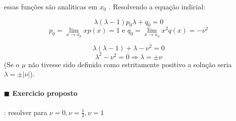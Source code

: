    essas funções são analiticas em \( x_0 \) .
   Resolvendo a equação indicial:
   
   \[ \lambda (\lambda - 1) p_0 \lambda + q_0 = 0 \]
   \[ p_0 =  \lim_{x\to x_0} xp(x) = 1 \text{ e }  q_0 = \lim_{x \to x_0} x^2q(x) = - \nu^2\]
   
   \[ \lambda (\lambda - 1) + \lambda - \nu^2 = 0  \]
   \[ \lambda ^2 - \nu^2 = 0 \Rightarrow \lambda  = \pm \nu  \]
   (Se o \( \mu \) não tivesse sido definido como estritamente positivo a solução seria \( \lambda  =
   \pm | \nu|\)).
   

   \paragraph{$\blacksquare$ Exercicio proposto}:  resolver para \( \nu = 0, \nu = \frac{1}{2}, \nu = 1 \) 
   
 


  